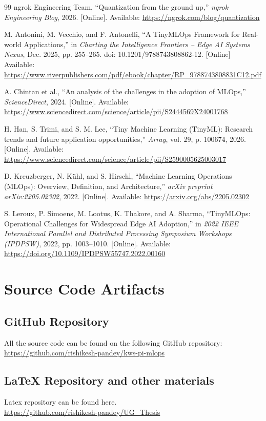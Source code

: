 \documentclass[11pt,a4paper,openany]{book}
\begin{document}
\begin{thebibliography}{99}
 ngrok Engineering Team, ``Quantization from the ground up,'' \textit{ngrok Engineering Blog}, 2026. [Online]. Available: \url{https://ngrok.com/blog/quantization}

 M. Antonini, M. Vecchio, and F. Antonelli, ``A TinyMLOps Framework for Real-world Applications,'' in \textit{Charting the Intelligence Frontiers – Edge AI Systems Nexus}, Dec. 2025, pp. 255–265. doi: 10.1201/9788743808862-12. [Online] Available: \url{https://www.riverpublishers.com/pdf/ebook/chapter/RP_9788743808831C12.pdf}

 A. Chintan et al., ``An analysis of the challenges in the adoption of MLOps,'' \textit{ScienceDirect}, 2024. [Online]. Available: \url{https://www.sciencedirect.com/science/article/pii/S2444569X24001768}

 H. Han, S. Trimi, and S. M. Lee, ``Tiny Machine Learning (TinyML): Research trends and future application opportunities,'' \textit{Array}, vol. 29, p. 100674, 2026. [Online]. Available: \url{https://www.sciencedirect.com/science/article/pii/S2590005625003017}

 D. Kreuzberger, N. Kühl, and S. Hirschl, ``Machine Learning Operations (MLOps): Overview, Definition, and Architecture,'' \textit{arXiv preprint arXiv:2205.02302}, 2022. [Online]. Available: \url{https://arxiv.org/abs/2205.02302}

 S. Leroux, P. Simoens, M. Lootus, K. Thakore, and A. Sharma, ``TinyMLOps: Operational Challenges for Widespread Edge AI Adoption,'' in \textit{2022 IEEE International Parallel and Distributed Processing Symposium Workshops (IPDPSW)}, 2022, pp. 1003--1010. [Online]. Available: \url{https://doi.org/10.1109/IPDPSW55747.2022.00160}

\end{thebibliography}

\appendix
\chapter{Source Code Artifacts}

\section{GitHub Repository}
All the source code can be found on the following GitHub repository:\\
\url{https://github.com/rishikesh-pandey/kws-pi-mlops}


\section{LaTeX Repository and other materials}
Latex repository can be found here.\\
\url{https://github.com/rishikesh-pandey/UG_Thesis}
\end{document}
